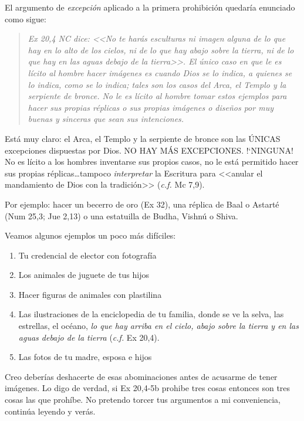 \documentclass{article}
\begin{document}
El argumento de \emph{excepci\'on} aplicado a la primera prohibici\'on quedar\'{i}a enunciado como sigue:

\begin{quote}
\emph{Ex 20,4 NC dice: <<No te har\'as esculturas ni imagen alguna de lo que hay en lo alto de los cielos, ni de lo que hay abajo sobre la tierra, ni de lo que hay en las aguas debajo de la tierra>>. El \'unico caso en que le es l\'{i}cito al hombre hacer im\'agenes es cuando Dios se lo indica, a quienes se lo indica, como se lo indica; tales son los casos del Arca, el Templo y la serpiente de bronce. No le es l\'{i}cito al hombre tomar estos ejemplos para hacer sus propias r\'eplicas o sus propias im\'agenes o dise\~nos por muy buenas y sinceras que sean sus intenciones.}
\end{quote}

\noindent
Est\'a muy claro: el Arca, el Templo y la serpiente de bronce son las \'UNICAS excepciones dispuestas por Dios. NO HAY M\'AS EXCEPCIONES. !`NINGUNA! No es l\'{i}cito a los hombres inventarse sus propios casos, no le est\'a permitido hacer sus propias r\'eplicas\ldots tampoco \emph{interpretar} la Escritura para <<anular el mandamiento de Dios con la tradici\'on>> (\emph{c.f.} Mc 7,9).

Por ejemplo: hacer un becerro de oro (Ex 32), una r\'eplica de Baal o Astart\'e (Num 25,3; Jue 2,13) o una estatuilla de Budha, Vishn\'u o Shiva.

Veamos algunos ejemplos un poco m\'as dif\'{i}ciles:

\begin{enumerate}
\item Tu credencial de elector con fotograf\'{i}a
\item Los animales de juguete de tus hijos
\item Hacer figuras de animales con plastilina
\item Las ilustraciones de la enciclopedia de tu familia, donde se ve la selva, las estrellas, el oc\'eano, \emph{lo que hay arriba en el cielo, abajo sobre la tierra y en las aguas debajo de la tierra} (\emph{c.f.} Ex 20,4).
\item Las fotos de tu madre, esposa e hijos
\end{enumerate}

\noindent
Creo deber\'{i}as deshacerte de esas abominaciones antes de acusarme de tener im\'agenes. Lo digo de verdad, si Ex 20,4-5b prohibe tres cosas entonces son tres cosas las que proh\'{i}be. No pretendo torcer tus argumentos a mi conveniencia, contin\'ua leyendo y ver\'as.
\end{document}
